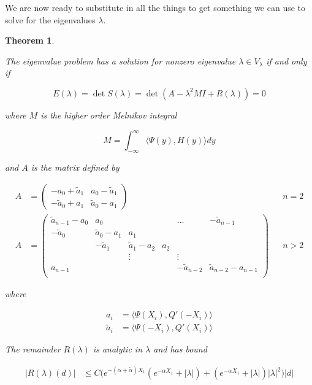 \documentclass[12pt]{article}
\newtheorem{theorem}{Theorem}
\begin{document}
We are now ready to substitute in all the things to get something we can use to solve for the eigenvalues $\lambda$.


\begin{theorem}\label{evpsol}

The eigenvalue problem has a solution for nonzero eigenvalue $\lambda \in V_\lambda$ if and only if

\begin{equation}\label{matrixdet}
E(\lambda) = \det S(\lambda) = \det(A - \lambda^2 MI + R(\lambda) ) = 0
\end{equation}

where $M$ is the higher order Melnikov integral 

\begin{equation}
M =  \int_{-\infty}^\infty \langle \Psi(y), H(y) \rangle dy
\end{equation}

and $A$ is the matrix defined by

\begin{align*}
A &= \begin{pmatrix}
-a_0 + \tilde{a}_1 & a_0 - \tilde{a}_1 \\
-\tilde{a}_0 + a_1 & \tilde{a}_0 - a_1
\end{pmatrix} && n = 2 \\
A &= \begin{pmatrix}
\tilde{a}_{n-1} - a_0 & a_0 & & & \dots & -\tilde{a}_{n-1}\\
-\tilde{a}_0 & \tilde{a}_0 - a_1 &  a_1 \\
& -\tilde{a}_1 & \tilde{a}_1 - a_2 &  a_2 \\
& & \vdots & & \vdots \\
a_{n-1} & & & & -\tilde{a}_{n-2} & \tilde{a}_{n-2} - a_{n-1} \\
\end{pmatrix} && n > 2
\end{align*}

where

\begin{align*}
a_i &= \langle \Psi(X_i), Q'(-X_i) \rangle \\
\tilde{a}_i &= \langle \Psi(-X_i), Q'(X_i) \rangle
\end{align*}

The remainder $R(\lambda)$ is analytic in $\lambda$ and has bound

\begin{align*}
|R(\lambda)(d)| &\leq C \Big( e^{-(\alpha + \tilde{\alpha})X_1}( e^{-\alpha X_1} + |\lambda|  )  
+ (e^{-\alpha X_1} + |\lambda| ) |\lambda|^2 \Big) |d|
\end{align*}


\end{theorem}
\end{document}
